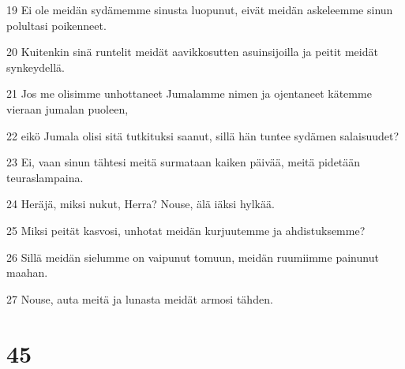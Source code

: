 \par 19 Ei ole meidän sydämemme sinusta luopunut, eivät meidän askeleemme sinun polultasi poikenneet.
\par 20 Kuitenkin sinä runtelit meidät aavikkosutten asuinsijoilla ja peitit meidät synkeydellä.
\par 21 Jos me olisimme unhottaneet Jumalamme nimen ja ojentaneet kätemme vieraan jumalan puoleen,
\par 22 eikö Jumala olisi sitä tutkituksi saanut, sillä hän tuntee sydämen salaisuudet?
\par 23 Ei, vaan sinun tähtesi meitä surmataan kaiken päivää, meitä pidetään teuraslampaina.
\par 24 Heräjä, miksi nukut, Herra? Nouse, älä iäksi hylkää.
\par 25 Miksi peität kasvosi, unhotat meidän kurjuutemme ja ahdistuksemme?
\par 26 Sillä meidän sielumme on vaipunut tomuun, meidän ruumiimme painunut maahan.
\par 27 Nouse, auta meitä ja lunasta meidät armosi tähden.

\chapter{45}

